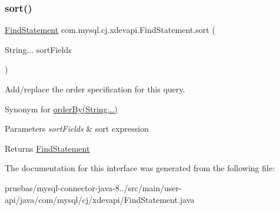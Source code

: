 \subsubsection{\texorpdfstring{sort()}{sort()}}
{\footnotesize\ttfamily \mbox{\hyperlink{interfacecom_1_1mysql_1_1cj_1_1xdevapi_1_1_find_statement}{Find\+Statement}} com.\+mysql.\+cj.\+xdevapi.\+Find\+Statement.\+sort (\begin{DoxyParamCaption}\item[{String...}]{sort\+Fields }\end{DoxyParamCaption})}

Add/replace the order specification for this query. 

Synonym for \mbox{\hyperlink{}{order\+By(\+String...)}}


\begin{DoxyParams}{Parameters}
{\em sort\+Fields} & sort expression \\
\hline
\end{DoxyParams}
\begin{DoxyReturn}{Returns}
\mbox{\hyperlink{interfacecom_1_1mysql_1_1cj_1_1xdevapi_1_1_find_statement}{Find\+Statement}} 
\end{DoxyReturn}


The documentation for this interface was generated from the following file\+:\begin{DoxyCompactItemize}
\item 
pruebas/mysql-\/connector-\/java-\/8../src/main/user-\/api/java/com/mysql/cj/xdevapi/Find\+Statement.\+java\end{DoxyCompactItemize}
